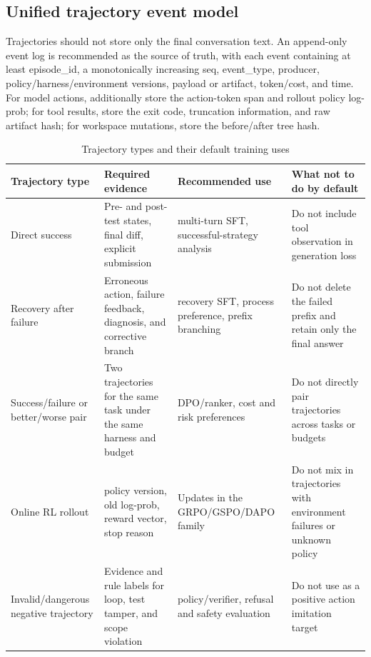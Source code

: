 \documentclass[10pt,a4paper,UTF8,fontset=none]{ctexart}
\newcommand{\ident}[1]{{\rmfamily #1}}
\begin{document}
\subsection{Unified trajectory event model}

Trajectories should not store only the final conversation text. An append-only event log is recommended as the source of truth, with each event containing at least \ident{episode\_id}, a monotonically increasing \ident{seq}, \ident{event\_type}, producer, policy/harness/environment versions, payload or artifact, token/cost, and time. For model actions, additionally store the action-token span and rollout policy log-prob; for tool results, store the exit code, truncation information, and raw artifact hash; for workspace mutations, store the before/after tree hash.

\begin{table}[htbp]
\centering
\caption{Trajectory types and their default training uses}
\label{tab:trajectory-usage}
\small
\begin{tabularx}{\textwidth}{p{2.5cm}p{4.5cm}YY}
\toprule
Trajectory type & Required evidence & Recommended use & What not to do by default \\
\midrule
Direct success & Pre- and post-test states, final diff, explicit submission & multi-turn SFT, successful-strategy analysis & Do not include tool observation in generation loss \\
Recovery after failure & Erroneous action, failure feedback, diagnosis, and corrective branch & recovery SFT, process preference, prefix branching & Do not delete the failed prefix and retain only the final answer \\
Success/failure or better/worse pair & Two trajectories for the same task under the same harness and budget & DPO/ranker, cost and risk preferences & Do not directly pair trajectories across tasks or budgets \\
Online RL rollout & policy version, old log-prob, reward vector, stop reason & Updates in the GRPO/GSPO/DAPO family & Do not mix in trajectories with environment failures or unknown policy \\
Invalid/dangerous negative trajectory & Evidence and rule labels for loop, test tamper, and scope violation & policy/verifier, refusal and safety evaluation & Do not use as a positive action imitation target \\
\bottomrule
\end{tabularx}
\end{table}
\end{document}
